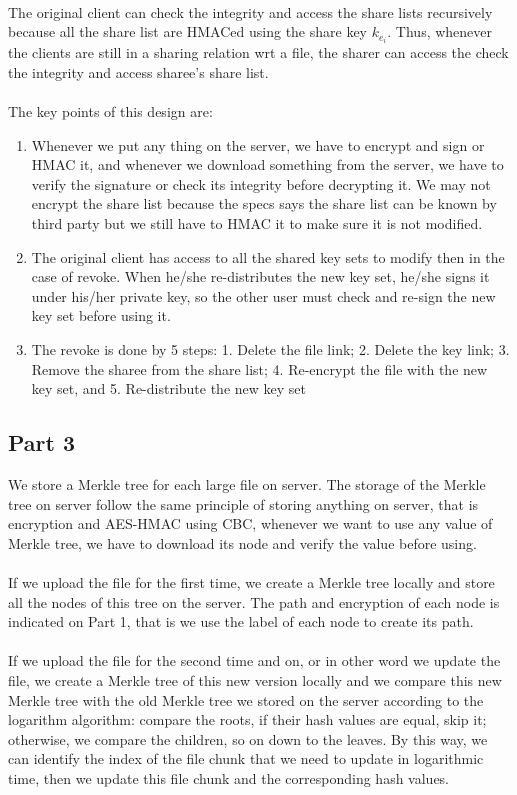 \documentclass[a4paper, 11pt]{article}
\begin{document}
\\
The original client can check the integrity and access the share lists recursively because all the share list are HMACed using the share key $k_{e_i}$. Thus, whenever the clients are still in a sharing relation wrt a file, the sharer can access the check the integrity and access sharee's share list.\\
\\
The key points of this design are:
%
\begin{enumerate}
	\item Whenever we put any thing on the server, we have to encrypt and sign or HMAC it, and whenever we download something from the server, we have to verify the signature or check its integrity before decrypting it. We may not encrypt the share list because the specs says the share list can be known by third party but we still have to HMAC it to make sure it is not modified.
	\item The original client has access to all the shared key sets to modify then in the case of revoke. When he/she re-distributes the new key set, he/she signs it under his/her private key, so the other user must check and re-sign the new key set before using it.
	\item The revoke is done by 5 steps: 1. Delete the file link; 2. Delete the key link; 3. Remove the sharee from the share list; 4. Re-encrypt the file with the new key set, and 5. Re-distribute the new key set
\end{enumerate}

\subsection*{Part 3}
We store a Merkle tree for each large file on server. The storage of the Merkle tree on server follow the same principle of storing anything on server, that is encryption and AES-HMAC using CBC, whenever we want to use any value of Merkle tree, we have to download its node and verify the value before using.\\
\\
If we upload the file for the first time, we create a Merkle tree locally and store all the nodes of this tree on the server. The path and encryption of each node is indicated on Part 1, that is we use the label of each node to create its path.\\
\\
If we upload the file for the second time and on, or in other word we update the file, we create a Merkle tree of this new version locally and we compare this new Merkle tree with the old Merkle tree we stored on the server according to the logarithm algorithm: compare the roots, if their hash values are equal, skip it; otherwise, we compare the children, so on down to the leaves. By this way, we can identify the index of the file chunk that we need to update in logarithmic time, then we update this file chunk and the corresponding hash values. 
\end{document}
